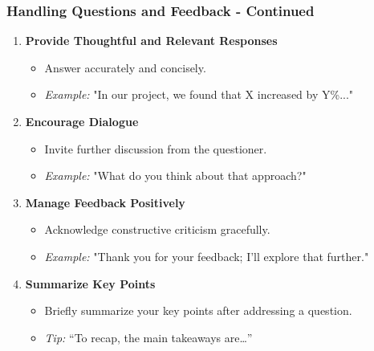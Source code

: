 \documentclass[aspectratio=169]{beamer}
\begin{document}
\begin{frame}[fragile]
    \frametitle{Handling Questions and Feedback - Continued}
    \begin{enumerate}[resume]
        \item \textbf{Provide Thoughtful and Relevant Responses}
        \begin{itemize}
            \item Answer accurately and concisely.
            \item \textit{Example:} "In our project, we found that X increased by Y\%..."
        \end{itemize}
        
        \item \textbf{Encourage Dialogue}
        \begin{itemize}
            \item Invite further discussion from the questioner.
            \item \textit{Example:} "What do you think about that approach?"
        \end{itemize}

        \item \textbf{Manage Feedback Positively}
        \begin{itemize}
            \item Acknowledge constructive criticism gracefully.
            \item \textit{Example:} "Thank you for your feedback; I'll explore that further."
        \end{itemize}
        
        \item \textbf{Summarize Key Points}
        \begin{itemize}
            \item Briefly summarize your key points after addressing a question.
            \item \textit{Tip:} “To recap, the main takeaways are…”
        \end{itemize}
    \end{enumerate}
\end{frame}
\end{document}
